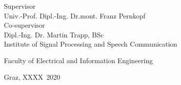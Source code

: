 \begin{titlingpage}
\begin{center}
\vfill\vfill\vfill
\vfill\vfill\vfill

Supervisor\\
Univ.-Prof. Dipl.-Ing. Dr.\thinspace{}mont. Franz Pernkopf\\
\vfill
Co-supervisor\\
Dipl.-Ing. Dr. Martin Trapp, BSc\\
\vfill
\vfill
Institute of Signal Processing and Speech Communication\\

\vfill

Faculty of Electrical and Information Engineering

\vfill\vfill\vfill

{\scriptsize Graz, XXXX~2020}

\end{center}
\end{titlingpage}

